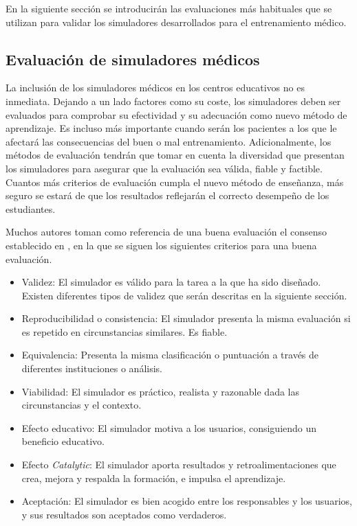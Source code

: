 En la siguiente sección se introducirán las evaluaciones más habituales que se utilizan para validar los simuladores desarrollados para el entrenamiento médico.



\subsection{Evaluación de simuladores médicos}

La inclusión de los simuladores médicos en los centros educativos no es inmediata. Dejando a un lado factores como su coste, los simuladores deben ser evaluados para comprobar su efectividad y su adecuación como nuevo método de aprendizaje. Es incluso más importante cuando serán los pacientes a los que le afectará las consecuencias del buen o mal entrenamiento.
Adicionalmente, los métodos de evaluación tendrán que tomar en cuenta la diversidad que presentan los simuladores para asegurar que la evaluación sea válida, fiable y factible. 
Cuantos más criterios de evaluación cumpla el nuevo método de enseñanza, más seguro se estará de que los resultados reflejarán el correcto desempeño de los estudiantes.

Muchos autores toman como referencia de una buena evaluación el consenso establecido en  \cite{norcini2011criteria}, en la que se siguen los siguientes criterios para una buena evaluación.

\begin{itemize}
\item Validez: El simulador es válido para la tarea a la que ha sido diseñado. Existen diferentes tipos de validez que serán descritas en la siguiente sección.
\item Reproducibilidad o consistencia: El simulador presenta la misma evaluación si es repetido en circunstancias similares. Es fiable.
\item Equivalencia: Presenta la misma clasificación o puntuación a través de diferentes instituciones o análisis.
\item Viabilidad: El simulador es práctico, realista y razonable dada las circunstancias y el contexto.
\item Efecto educativo: El simulador motiva a los usuarios, consiguiendo un beneficio educativo.
\item Efecto \emph{Catalytic}: El simulador aporta resultados y retroalimentaciones que crea, mejora y respalda la formación, e impulsa el aprendizaje.
\item Aceptación: El simulador es bien acogido entre los responsables y los usuarios, y sus resultados son aceptados como verdaderos.
\end{itemize}

